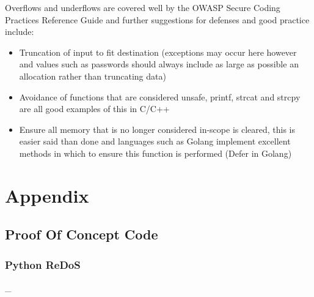 \documentclass{IEEEtran}
\newcommand\pythonstyle{
        \lstset{style=python}
    }
\newcommand\pythonexternal[2][]{{
        \pythonstyle
        }}
\begin{document}
                Overflows and underflows are covered well by the OWASP Secure Coding Practices
                Reference Guide\cite{OWASP-SCP-Quick-Reference-Guide-v2} and further suggestions 
                for defenses and good practice include: 
                \begin{itemize}
                    \item Truncation of input to fit destination (exceptions may occur here however and values such as passwords should always include as large as possible an allocation rather than truncating data)
                    \item Avoidance of functions that are considered unsafe, printf, strcat and 
                    strcpy are all good examples of this in C/C++
                    \item Ensure all memory that is no longer considered in-scope is cleared, this 
                    is easier said than done and languages such as Golang\cite{Golang} implement 
                    excellent methods in which to ensure this function is performed (Defer in Golang)\cite{Golang-Defer}
                \end{itemize}

    \newpage

    \printbibliography

    \newpage
    \onecolumn

    \appendix
    \section{Appendix}
        \subsection{Proof Of Concept Code}
            \subsubsection{Python ReDoS}
            \label{sec:PyReDoS}
            \_
            \medskip
                \pythonexternal{Resources/regex.py}

    
\end{document}
